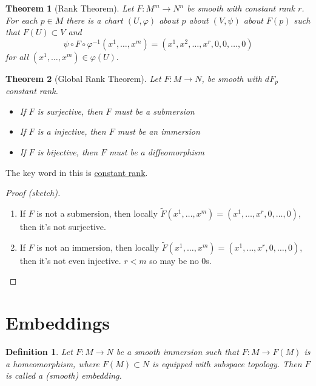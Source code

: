 \documentclass[a4paper]{article}
\newtheorem*{defn}{Definition}
\newtheorem*{thm}{Theorem}
\begin{document}
\begin{thm}[Rank Theorem]
  Let $F: M^m \rightarrow N^n$ be smooth with constant rank $r$. For each $p \in M$ there is a chart $(U, \varphi)$ about $p$ about $(V, \psi)$ about $F(p)$ such that $F(U) \subset V$  and
  \[
    \psi \circ F \circ \varphi^{-1}(x^1, \dots, x^m) = (x^1, x^2, \dots, x^r, 0, 0, \dots, 0)
  \]
  for all $(x^1, \dots, x^m) \in \varphi(U).$
\end{thm}

\begin{thm}[Global Rank Theorem]
  Let $F: M \rightarrow N$, be smooth with $dF_p$ constant rank. 
  \begin{itemize}
    \item If $F$ is surjective, then $F$ must be a submersion 
  \item If $F$ is a injective, then $F$ must be an immersion
  \item If $F$ is bijective, then $F$ must be a diffeomorphism
  \end{itemize}
\end{thm}
The key word in this is \underline{constant rank}.

\begin{proof}[Proof (sketch)]
  \begin{enumerate}
    \item If $F$ is not a submersion, then locally $\tilde{F}(x^1, \dots, x^m) = (x^1, \dots, x^r, 0, \dots, 0)$, then it's not surjective.
    \item If $F$ is not an immersion, then locally $\tilde{F}(x^1, \dots, x^m) = (x^1, \dots, x^r, 0, \dots, 0)$, then it's not even injective. $r < m$ so may be no 0s.
  \end{enumerate}
\end{proof}

\section*{Embeddings}%

\begin{defn}
  Let $F: M \rightarrow N$ be a smooth immersion such that $F: M \rightarrow F(M)$ is a homeomorphism, where $F(M) \subset N$ is equipped with subspace topology. Then $F$ is called a (smooth) embedding.
\end{defn}
\end{document}
